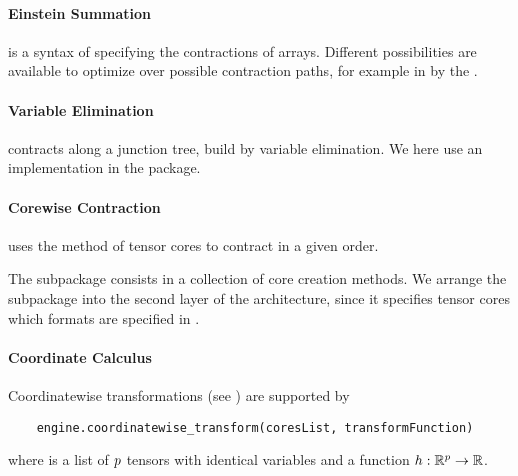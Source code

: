 \paragraph{Einstein Summation}
is a syntax of specifying the contractions of arrays.
Different possibilities are available to optimize over possible contraction paths, for example in  by the .

\paragraph{Variable Elimination}
contracts along a junction tree, build by variable elimination.
We here use an implementation in the  package.

\paragraph{Corewise Contraction}
uses the  method of tensor cores to contract in a given order.





\label{sec:implementationRepresentation}

The \sprepresentation subpackage consists in a collection of core creation methods.
We arrange the \sprepresentation subpackage into the second layer of the \tnreason architecture, since it specifies tensor cores which formats are specified in \spengine.

\paragraph{Coordinate Calculus}
Coordinatewise transformations (see ) are supported by
\begin{lstlisting}
	engine.coordinatewise_transform(coresList, transformFunction)
\end{lstlisting}
where  is a list of $p$ tensors with identical variables and  a function $h: \mathbb{R}^{p} \rightarrow \mathbb{R}$.

